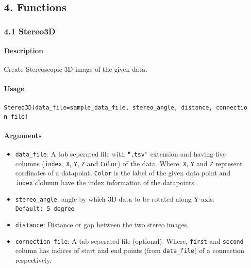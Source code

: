 \documentclass[]{article}
\providecommand{\tightlist}{%
  \setlength{\itemsep}{0pt}\setlength{\parskip}{0pt}}
\let\oldparagraph\paragraph
\renewcommand{\paragraph}[1]{\oldparagraph{#1}\mbox{}}
\begin{document}
\subsection{4. Functions}\label{functions}

\subsubsection{4.1 Stereo3D}\label{stereo3d}

\paragraph{\texorpdfstring{\textbf{Description}}{Description}}\label{description}

Create Stereoscopic 3D image of the given data.

\paragraph{\texorpdfstring{\textbf{Usage}}{Usage}}\label{usage}

\texttt{Stereo3D(data\_file=sample\_data\_file,\ stereo\_angle,\ distance,\ connection\_file)}

\paragraph{\texorpdfstring{\textbf{Arguments
}}{Arguments }}\label{arguments}

\begin{itemize}
\tightlist
\item
  \texttt{data\_file}: A tab seperated file with \texttt{".tsv"}
  extension and having five columns (\texttt{index}, \texttt{X},
  \texttt{Y}, \texttt{Z} and \texttt{Color}) of the data. Where,
  \texttt{X}, \texttt{Y} and \texttt{Z} represent cordinates of a
  datapoint, \texttt{Color} is the label of the given data point and
  \texttt{index} clolumn have the index information of the datapoints.
\item
  \texttt{stereo\_angle}: angle by which 3D data to be rotated along
  Y-axis. \texttt{Default:\ 5\ degree}
\item
  \texttt{distance}: Distance or gap between the two stereo images.
\item
  \texttt{connection\_file}: A tab seperated file (optional). Where,
  \texttt{first} and \texttt{second} column has indices of start and end
  points (from \texttt{data\_file}) of a connection respectively.
\end{itemize}
\end{document}
